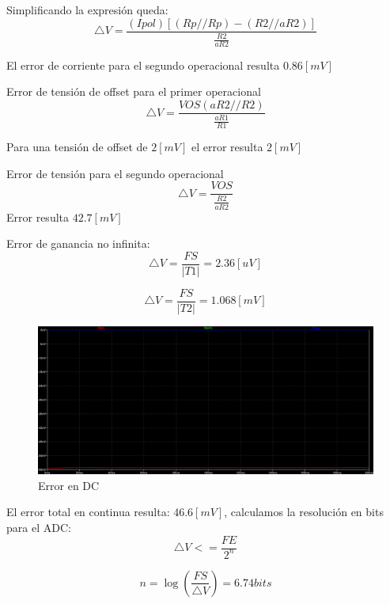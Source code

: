 \documentclass[12pt]{article}
\begin{document}
	Simplificando la expresión queda:
	\begin{equation}
		\bigtriangleup V= \frac{(Ipol)[(Rp//Rp)-(R2//aR2)]}{\frac{R2}{aR2}}
	\end{equation}
	
	El error de corriente para el segundo operacional resulta $0.86[mV]$
	
	Error de tensión de offset para el primer operacional
	\begin{equation}
		\bigtriangleup V = \frac{VOS(aR2//R2)}{\frac{aR1}{R1}}
	\end{equation}
	
	Para una tensión de offset de  $2[mV]$  el error resulta $2[mV]$
	
	Error de tensión para el segundo operacional
	\begin{equation}
		\bigtriangleup V=\frac{VOS}{\frac{R2}{aR2}}
	\end{equation}
	Error resulta $42.7[mV]$
	
	Error de ganancia no infinita:
	\begin{equation}
		\bigtriangleup V = \frac{FS}{|T1|}=2.36[uV]
	\end{equation}
	
		\begin{equation}
		\bigtriangleup V = \frac{FS}{|T2|}=1.068[mV]
	\end{equation}
	
	\begin{figure}
		\includegraphics[width=\linewidth]{Imagenes_simulaciones/Sim_Error_DC_C2}
		\caption[Error en DC]{Error en DC}
		\label{fig:simerrordcc2}
	\end{figure}
	
	El error total en continua resulta: $46.6[mV]$, calculamos la resolución en bits para el ADC:
	\begin{equation}
		\bigtriangleup V <= \frac{FE}{2^n}
	\end{equation}
	
	\begin{equation}
		n = \log(\frac{FS}{\bigtriangleup V}) = 6.74 bits
	\end{equation}
	
\end{document}
